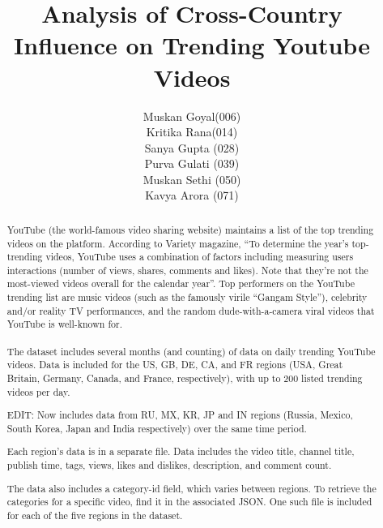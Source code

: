 \documentclass[runningheads]{llncs}
\begin{document}
%
\title{Analysis of Cross-Country Influence on Trending Youtube Videos}
%
%
\author{
Muskan Goyal(006) \\
Kritika Rana(014) \\
Sanya Gupta (028) \\
Purva Gulati (039) \\
Muskan Sethi (050) \\
Kavya Arora (071)  
}
%
%
%
\maketitle              %
%
\begin{abstract}
YouTube (the world-famous video sharing website) maintains a list of the top trending videos on the platform. According to Variety magazine, “To determine the year’s top-trending videos, YouTube uses a combination of factors including measuring users interactions (number of views, shares, comments and likes). Note that they’re not the most-viewed videos overall for the calendar year”. Top performers on the YouTube trending list are music videos (such as the famously virile “Gangam Style”), celebrity and/or reality TV performances, and the random dude-with-a-camera viral videos that YouTube is well-known for.\\
\\
The dataset includes several months (and counting) of data on daily trending YouTube videos. Data is included for the US, GB, DE, CA, and FR regions (USA, Great Britain, Germany, Canada, and France, respectively), with up to 200 listed trending videos per day.

EDIT: Now includes data from RU, MX, KR, JP and IN regions (Russia, Mexico, South Korea, Japan and India respectively) over the same time period.

Each region’s data is in a separate file. Data includes the video title, channel title, publish time, tags, views, likes and dislikes, description, and comment count.

The data also includes a category-id field, which varies between regions. To retrieve the categories for a specific video, find it in the associated JSON. One such file is included for each of the five regions in the dataset.

\end{abstract}
%
%
%
\end{document}
